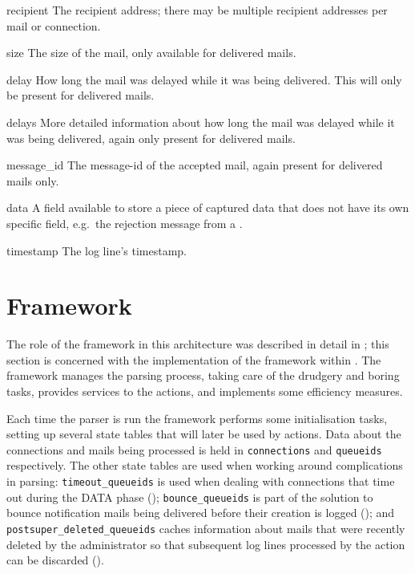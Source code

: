 \begin{boldeqlist}
    \item [recipient] The recipient address; there may be multiple
        recipient addresses per mail or connection.

    \item [size] The size of the mail, only available for delivered mails.

    \item [delay] How long the mail was delayed while it was being
        delivered.  This will only be present for delivered mails.

    \item [delays] More detailed information about how long the mail was
        delayed while it was being delivered, again only present for
        delivered mails.

    \item [message\_id] The message-id of the accepted mail, again present
        for delivered mails only.

    \item [data] A field available to store a piece of captured data that
        does not have its own specific field, e.g.\ the rejection message
        from a \@.

    \item [timestamp] The log line's timestamp.

\end{boldeqlist}



\section{Framework}

\label{framework in implementation}

The role of the framework in this architecture was described in detail in
; this section is concerned with the
implementation of the framework within \parsername{}.  The framework
manages the parsing process, taking care of the drudgery and boring tasks,
provides services to the actions, and implements some efficiency measures.

Each time the parser is run the framework performs some initialisation
tasks, setting up several state tables that will later be used by actions.
Data about the connections and mails being processed is held in
\texttt{connections} and \texttt{queueids} respectively.  The other state
tables are used when working around complications in parsing:
\texttt{timeout\_queueids} is used when dealing with connections that time
out during the DATA phase ();
\texttt{bounce\_queueids} is part of the solution to bounce notification
mails being delivered before their creation is logged (); and
\texttt{postsuper\_deleted\_queueids} caches information about mails that
were recently deleted by the administrator so that subsequent log lines
processed by the  action can be discarded
().

